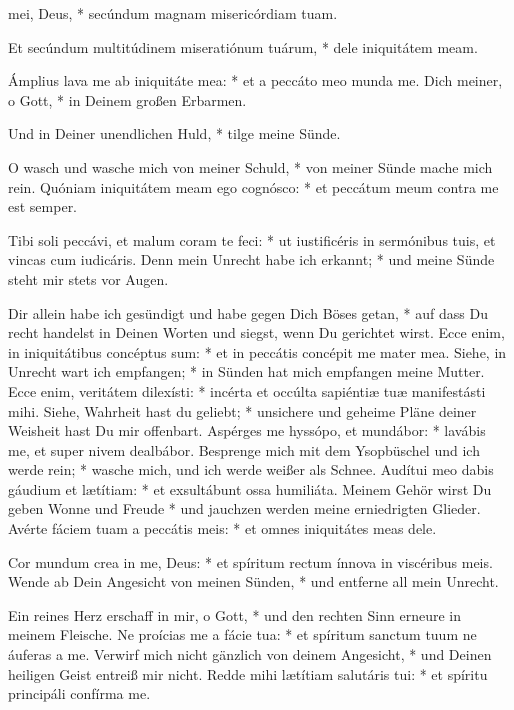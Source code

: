 \documentclass[fontsize=10pt,paper=A5,twoside,BCOR=1mm,DIV=21,headinclude]{scrarticle}
\begin{document}
\begin{paracol}{2} \pcb
\begin{psalmus}
 mei, Deus, * secúndum magnam misericórdiam tuam.

Et secúndum multitúdinem miseratiónum tuárum, * dele iniquitátem meam.

Ámplius lava me ab iniquitáte mea: * et a peccáto meo munda me.
\switchcolumn
{} Dich meiner, o Gott, * in Deinem großen Erbarmen.

Und in Deiner unendlichen Huld, * tilge meine Sünde.

O wasch und wasche mich von meiner Schuld, * von meiner Sünde mache mich rein.
\switchcolumn*
Quóniam iniquitátem meam ego cognósco: * et peccátum meum contra me est semper.

Tibi soli peccávi, et malum coram te feci: * ut iustificéris in sermónibus tuis, et vincas cum iudicáris.
\switchcolumn
Denn mein Unrecht habe ich erkannt; * und meine Sünde steht mir stets vor Augen.

Dir allein habe ich gesündigt und habe gegen Dich Böses getan, * auf dass Du recht handelst in Deinen Worten und siegst, wenn Du gerichtet wirst.
\switchcolumn*
Ecce enim, in iniquitátibus concéptus sum: * et in peccátis concépit me mater mea.
\switchcolumn
Siehe, in Unrecht wart ich empfangen; * in Sünden hat mich empfangen meine Mutter.
\switchcolumn*
Ecce enim, veritátem dilexísti: * incérta et occúlta sapiéntiæ tuæ manifestásti mihi.
\switchcolumn
Siehe, Wahrheit hast du geliebt; * unsichere und geheime Pläne deiner Weisheit hast Du mir offenbart.
\switchcolumn*
Aspérges me hyssópo, et mundábor: * lavábis me, et super nivem dealbábor.
\switchcolumn
Besprenge mich mit dem Ysopbüschel und ich werde rein; * wasche mich, und ich werde weißer als Schnee.
\switchcolumn*
Audítui meo dabis gáudium et lætítiam: * et exsultábunt ossa humiliáta.
\switchcolumn
Meinem Gehör wirst Du geben Wonne und Freude * und jauchzen werden meine erniedrigten Glieder.
\switchcolumn*
Avérte fáciem tuam a peccátis meis: * et omnes iniquitátes meas dele.

Cor mundum crea in me, Deus: * et spíritum rectum ínnova in viscéribus meis.
\switchcolumn
Wende ab Dein Angesicht von meinen Sünden, * und entferne all mein Unrecht.

Ein reines Herz erschaff in mir, o Gott, * und den rechten Sinn erneure in meinem Fleische.
\switchcolumn*
Ne proícias me a fácie tua: * et spíritum sanctum tuum ne áuferas a me.
\switchcolumn
Verwirf mich nicht gänzlich von deinem Angesicht, * und Deinen heiligen Geist entreiß mir nicht.
\switchcolumn*
Redde mihi lætítiam salutáris tui: * et spíritu principáli confírma me.


\end{psalmus}
\end{paracol}
\end{document}
